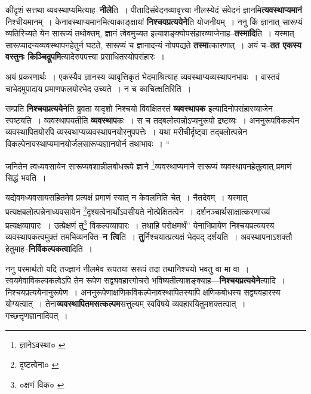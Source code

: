 \documentclass[article,12pt,a4paper]{memoir}
\begin{document}
	  \pstart कीदृशं सत्तथा व्यवस्थाप्यमित्याह--\textbf{नीले}ति । पीतादिसंवेदनव्यावृत्त्या नीलस्येदं संवेदनं ज्ञानमि\textbf{त्यवस्थाप्यमानं} निश्चीयमानम् । केनावस्थाप्यमानमित्याकाङ्क्षायां \textbf{निश्चयप्रत्ययेने}ति योजनीयम् । ननु किं ज्ञानात् सारूप्यं व्यतिरिच्यते येन सारूप्यं तथोक्तम्, ज्ञानं त्वेवमुच्यत इत्याशङ्क्योपसंहारव्याजेनाह--\textbf{तस्मादि}ति । यस्मात् सारूप्यादन्यव्यवस्थापनहेतुर्न घटते, सारूप्यं च ज्ञानादन्यं नोपपद्यते \textbf{तस्मा}त्कारणात् । अयं च--\textbf{तत एकस्य वस्तुनः किञ्चिद्रूपमि}त्यादेरुपपत्त्या प्रसाधितस्योपसंहारः ।
	\pend
      

	  \pstart अयं प्रकरणार्थः । एकस्यैव ज्ञानस्य व्यावृत्तिकृतं भेदमाश्रित्याह व्यवस्थाप्यव्यस्थापनभावः । वास्तवं चाभेदमुपादाय प्रमाणफलयोरभेद उच्यते । न च काचित्क्षतिरिति ।
	\pend
      

	  \pstart सम्प्रति \textbf{निश्चयप्रत्यये}नेति ब्रुवता यादृशो निश्चयो विवक्षितस्तं \textbf{व्यवस्थापक} इत्यादिनोपसंहारव्याजेन स्पष्टयति । व्यवस्थापयतीति \textbf{व्यवस्थाप}कः । स च तद्बलोत्पन्नोऽप्यनुरूपो द्रष्टव्यः । अननुरूपविकल्पेन व्यवस्थापितयोरपि व्यस्वथाप्यव्यवस्थापनयोरनुपपत्तेः । यथा मरीचीर्दृष्ट्वा तद्बलोत्पन्नेन विकल्पेनावस्थाप्यमानयोर्जलसारूप्यज्ञानयोर्न तथाभावः ।  \leavevmode{} “
	  
	जनितेन त्वध्यवसायेन सारूप्यवशान्नीलबोधरूपे ज्ञाने \footnote{ज्ञानेऽवस्था० \cite{dp-msA} \cite{dp-edP} \cite{dp-edH} \cite{dp-edE} \cite{dp-edN}}व्यवस्थाप्यमाने सारूप्यं व्यवस्थापनहेतुत्वात् प्रमाणं सिद्धं भवति । 
	  
	यद्येवमध्यवसायसहितमेव प्रत्यक्षं प्रमाणं स्यात् न केवलमिति चेत् । नैतदेवम् । यस्मात् प्रत्यक्षबलोत्पन्नेनाध्यवसायेन \footnote{दृष्टत्वेना० \cite{dp-msA} \cite{dp-msB} \cite{dp-msC} \cite{dp-msD} \cite{dp-edP} \cite{dp-edH} \cite{dp-edE} \cite{dp-edN}}दृश्यत्वेनार्थोऽवसीयते नोत्प्रेक्षितत्वेन । दर्शनञ्चार्थसाक्षात्करणाख्यं प्रत्यक्षव्यापारः । उत्प्रेक्षणं तु\footnote{०क्षणं विक० \cite{dp-msA} \cite{dp-msC} \cite{dp-msD}} विकल्पव्यापारः । तथाहि परोक्षमर्थं” येनाभिप्रायेण निश्चयप्रत्ययस्य व्यवस्थापकत्वमुक्तं तमभिव्यनक्ति--\textbf{न त्वि}ति । \textbf{तु}र्निश्चयात्प्रत्यक्षं भेदवद् दर्शयति । अवस्थापनाऽशक्तौ हेतुमाह--\textbf{निर्विकल्पकत्वा}दिति ।
	\pend
      

	  \pstart ननु परमार्थतो यदि तज्ज्ञानं नीलमेव रूपतया सरूपं तदा तथानिश्चयो भवतु वा मा वा । स्वयमेवाविकल्पकत्वेऽपि तेन रूपेण सद्व्यवहारगोचरो भविष्यतीत्याशङ्क्याह—\textbf{निश्चयप्रत्ययेने}त्यादि । निश्चयप्रत्ययेनानुरूपेण । अननुरूपेणाक्षणिकविकल्पेनावस्थापितस्यापि क्षणिकबोधस्य सद्व्यवहारस्य योग्यत्वात् । तेना\textbf{व्यवस्थापितमसत्कल्पम}सत्तुल्यम् स्वविषये व्यवहारयितुमशक्तत्वा\leavevmode{}त् । गच्छत्तृणज्ञानादिवत् ।
	\pend
      
\end{document}
